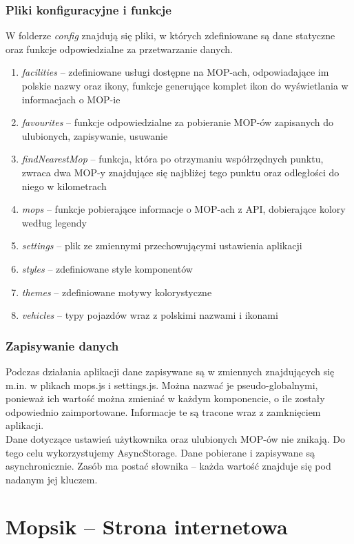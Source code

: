 \subsection{Pliki konfiguracyjne i funkcje}
W folderze \textit{config} znajdują się pliki, w których zdefiniowane są dane statyczne oraz funkcje odpowiedzialne za przetwarzanie danych.
\begin{enumerate}
\item \textit{facilities} -- zdefiniowane usługi dostępne na MOP-ach, odpowiadające im polskie nazwy oraz ikony, funkcje generujące komplet ikon do wyświetlania w informacjach o MOP-ie
\item \textit{favourites} -- funkcje odpowiedzialne za pobieranie MOP-ów zapisanych do ulubionych, zapisywanie, usuwanie
\item \textit{findNearestMop} -- funkcja, która po otrzymaniu współrzędnych punktu, zwraca dwa MOP-y znajdujące się najbliżej tego punktu oraz odległości do niego w kilometrach
\item \textit{mops} -- funkcje pobierające informacje o MOP-ach z API, dobierające kolory według legendy
\item \textit{settings} -- plik ze zmiennymi przechowującymi ustawienia aplikacji
\item \textit{styles} -- zdefiniowane style komponentów
\item \textit{themes} -- zdefiniowane motywy kolorystyczne
\item \textit{vehicles} -- typy pojazdów wraz z polskimi nazwami i ikonami
\end{enumerate}

\subsection{Zapisywanie danych}
Podczas działania aplikacji dane zapisywane są w zmiennych znajdujących się m.in. w plikach mops.js i settings.js. Można nazwać je pseudo-globalnymi, ponieważ ich wartość można zmieniać w każdym komponencie, o ile zostały odpowiednio zaimportowane. Informacje te są tracone wraz z zamknięciem aplikacji.\\
Dane dotyczące ustawień użytkownika oraz ulubionych MOP-ów nie znikają. Do tego celu wykorzystujemy AsyncStorage. Dane pobierane i zapisywane są asynchronicznie. Zasób ma postać słownika -- każda wartość znajduje się pod nadanym jej kluczem.


\chapter{Mopsik -- Strona internetowa}


